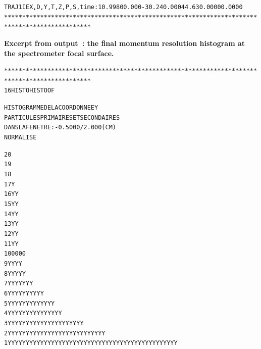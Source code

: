 \begin{tiny}
\begin{center}
\begin{alltt}
 TRAJ 1 IEX,D,Y,T,Z,P,S,time :  1  0.9980   0.000  -30.24  0.000  44.63   0.0000   0.0000    
**********************************************************************************************

\end{alltt}


\noindent \textbf{\normalsize Excerpt from \zgoubi output~: 
the final momentum resolution histogram at the spectrometer focal surface.}
\begin{alltt}
**********************************************************************************************
     16  HISTO       HISTO     OF      
                        
                      HISTOGRAMME  DE  LA  COORDONNEE  Y     
                      PARTICULES  PRIMAIRES  ET  SECONDAIRES
                      DANS  LA  FENETRE :  -0.5000     /    2.000     (CM) 
                      NORMALISE     

   20                                                                                                
   19                                                                                                
   18                                                                                        
   17                                              Y                                         
   16                                              Y         Y                               
   15                                              Y         Y                               
   14                                              Y         Y                               
   13                                              Y         Y                               
   12                                              Y         Y                               
   11                                              Y         Y                               
   10                                   0          0         0         0                     
    9                                   Y          Y         Y         Y                     
    8                                   Y          Y         YY        Y                     
    7                                   Y         YY         YY        YY                    
    6                       Y          YYY        YY         YY        YY                    
    5                       YY         YYY        YY         YY       YYYY                   
    4                       YY Y       YYY        YYY        YY       YYYY                   
    3                       YY YY     YYYYY       YYY       YYYY      YYYYY                  
    2                      YYYYYY     YYYYYY     YYYY       YYYYY     YYYYYY                 
    1                     YYYYYYYYYYYYYYYYYYYYYYYYYYYYYYY YYYYYYYY   YYYYYYYY         


\end{alltt}
\end{center}
\end{tiny}
